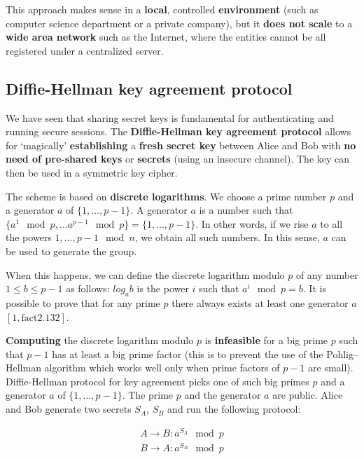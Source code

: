 This approach makes sense in a \textbf{local}, controlled \textbf{environment} (such as computer science department or a private company), but it \textbf{does not scale} to a \textbf{wide area network} such as the Internet, where the entities cannot be all registered under a centralized server.

\subsection{Diffie-Hellman key agreement protocol}
We have seen that sharing secret keys is fundamental for authenticating and running secure sessions. The \textbf{Diffie-Hellman key agreement protocol} allows for ‘magically’ \textbf{establishing} a \textbf{fresh secret key} between Alice and Bob with \textbf{no need of pre-shared keys} or \textbf{secrets} (using an insecure channel). The key can then be used in a symmetric key cipher.

The scheme is based on \textbf{discrete logarithms}. We choose a prime number $p$ and a generator $a$ of $\{1, \ldots ,p-1\}$. A generator $a$ is a number such that $\{ a^1 \mod p, \ldots a^{p-1} \mod p\} = \{ 1, \ldots, p-1 \}$. In other words, if we rise $a$ to all the powers $1, \ldots ,p-1 \mod n$, we obtain all such numbers. In this sense, $a$ can be used to generate the group. 


When this happens, we can define the discrete logarithm modulo $p$ of any number $1 \leq b \leq p-1$ as follows: $log_a b$ is the power $i$ such that $a^i \mod p = b$. It is possible to prove that for any prime $p$ there always exists at least one generator $a$ $[1, \text{fact} 2.132]$.


\textbf{Computing} the discrete logarithm modulo $p$ is \textbf{infeasible} for a big prime $p$ such that $p-1$ has at least a big prime factor (this is to prevent the use of the Pohlig–Hellman algorithm which works well only when prime factors of $p-1$ are small). Diffie-Hellman protocol for key agreement picks one of such big primes $p$ and a generator $a$ of $\{1, \ldots, p-1 \}$. The prime $p$ and the generator $a$ are public. Alice and Bob generate two secrets $S_A$, $S_B$ and run the following protocol:

$$\begin{array}{l} A \rightarrow B: a^{S_A} \mod p \\ B \rightarrow A: a^{S_B} \mod p \end{array} $$

